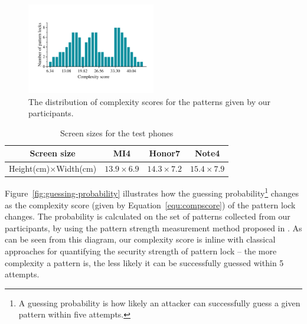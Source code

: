         \begin{figure}[!t]
            \centering
            \includegraphics[width=0.5\textwidth]{fig/pattern-strength.pdf}
            \caption{The distribution of complexity scores for the patterns given by our participants.}
            \label{fig:pattern-strength}
        \end{figure}

    \begin{table}[!t]
            \centering
            \caption{Screen sizes for the test phones}
            \label{tab:locking-screen-size}
            \small
            \begin{tabular}{cccc}
                \toprule
                \textbf{Screen size} & \textbf{MI4} & \textbf{Honor7} & \textbf{Note4} \\
                \midrule
                Height(cm)$\times$Width(cm) & $13.9\times6.9$ & $14.3\times7.2$ & $15.4\times7.9$ \\
                \bottomrule
            \end{tabular}
    \end{table}

    Figure~\ref{fig:guessing-probability} illustrates how the guessing probability\footnote{A guessing probability is
    how likely an attacker can successfully guess a given pattern within five attempts.} changes as the complexity score (given by Equation~\ref{equ:compscore}) of the pattern lock changes.
    The probability is calculated on the set of patterns collected from our participants, by using the pattern strength
    measurement method proposed in \cite{Heidt2016Refining}. As can be seen from this diagram,
    our complexity score is inline with classical approaches for quantifying the security strength of pattern lock -- the more complexity a
    pattern is, the less likely it can be successfully guessed within 5 attempts.



